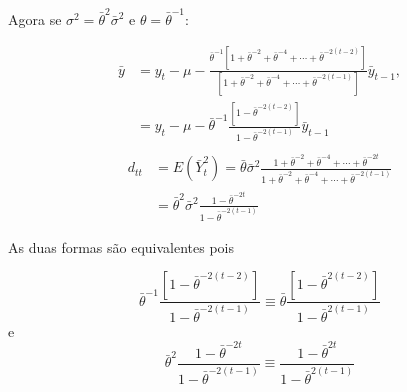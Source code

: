 \begin{enumerate}
	Agora se $\sigma^2=\bar{\theta}^2\bar{\sigma}^2$ e $\theta=\bar{\theta}^{-1}$:
	
		\begin{align*}
	\bar{y}&=y_t-\mu-\frac{\bar{\theta}^{-1}[1+\bar{\theta}^{-2}+\bar{\theta}^{-4}+\cdots+\bar{\theta}^{-2(t-2)}]}{[1+\bar{\theta}^{-2}+\bar{\theta}^{-4}+\cdots+\bar{\theta}^{-2(t-1)}]}\bar{y}_{t-1},\\
	&=y_t-\mu-\bar{\theta}^{-1}\frac{[1-\bar{\theta}^{-2(t-2)}]}{1-\bar{\theta}^{-2(t-1)}}\bar{y}_{t-1}\\
	\end{align*}
	\begin{align*}
	d_{tt}&=E(\bar{Y}_t^2)=\bar{\theta}\bar{\sigma}^2\frac{1+\bar{\theta}^{-2}+\bar{\theta}^{-4}+\cdots+\bar{\theta}^{-2t}}{1+\bar{\theta}^{-2}+\bar{\theta}^{-4}+\cdots+\bar{\theta}^{-2(t-1)}}\\
	&=\bar{\theta}^2\bar{\sigma}^2\frac{1-\bar{\theta}^{-2t}}{1-\bar{\theta}^{-2(t-1)}}
	\end{align*}
	
	As duas formas são equivalentes pois
	
	$$\bar{\theta}^{-1}\frac{[1-\bar{\theta}^{-2(t-2)}]}{1-\bar{\theta}^{-2(t-1)}}\equiv \bar{\theta}\frac{[1-\bar{\theta}^{2(t-2)}]}{1-\bar{\theta}^{2(t-1)}}$$
	e
	$$\bar{\theta}^2\frac{1-\bar{\theta}^{-2t}}{1-\bar{\theta}^{-2(t-1)}}\equiv \frac{1-\bar{\theta}^{2t}}{1-\bar{\theta}^{2(t-1)}}$$
\end{enumerate}